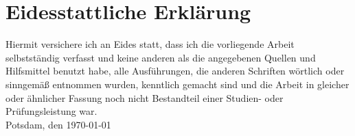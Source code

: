 \pagebreak
\thispagestyle{empty}
\section*{Eidesstattliche Erklärung}

Hiermit versichere ich an Eides statt, dass ich die vorliegende Arbeit selbstständig verfasst und keine anderen als die angegebenen Quellen und Hilfsmittel benutzt habe, alle Ausführungen, die anderen Schriften wörtlich oder sinngemäß entnommen wurden, kenntlich gemacht sind und die Arbeit in gleicher oder ähnlicher Fassung noch nicht Bestandteil einer Studien- oder Prüfungsleistung war.\\[5cm]

Potsdam, den \today \hfill \autorname